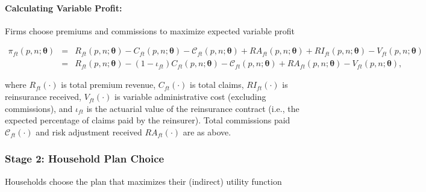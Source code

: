 \documentclass[12pt]{article}
\begin{document}
\paragraph{Calculating Variable Profit:} 
Firms choose premiums and commissions to maximize expected variable profit

\vspace{-0.4in}		
\begin{footnotesize}
\begin{eqnarray}
\label{eqn:profit}
	\pi_{ft}(\textit{p},\textit{n};\boldsymbol{\theta}) &=&  R_{ft}(\textit{p},\textit{n};\boldsymbol{\theta}) -  C_{ft}(\textit{p},\textit{n};\boldsymbol{\theta}) - \mathcal{C}_{ft}(\textit{p},\textit{n};\boldsymbol{\theta}) + RA_{ft}(\textit{p},\textit{n};\boldsymbol{\theta}) +  RI_{ft}(\textit{p},\textit{n};\boldsymbol{\theta})  - V_{ft}(\textit{p},\textit{n};\boldsymbol{\theta})  \nonumber \\
	&=& R_{ft}(\textit{p},\textit{n};\boldsymbol{\theta}) - (1 - \iota_{ft}) C_{ft}(\textit{p},\textit{n};\boldsymbol{\theta}) - \mathcal{C}_{ft}(\textit{p},\textit{n};\boldsymbol{\theta}) + RA_{ft}(\textit{p},\textit{n};\boldsymbol{\theta})   - V_{ft}(\textit{p},\textit{n};\boldsymbol{\theta}),
\end{eqnarray}
\end{footnotesize}

\noindent where $R_{ft}(\cdot)$ is total premium revenue, $C_{ft}(\cdot)$ is total claims, $RI_{ft}(\cdot)$ is reinsurance received, $V_{ft}(\cdot)$  is variable administrative cost (excluding commissions), and $\iota_{ft}$ is the actuarial value of the reinsurance contract (i.e., the expected percentage of claims paid by the reinsurer).  Total commissions paid $\mathcal{C}_{ft}(\cdot)$ and risk adjustment received  $RA_{ft}(\cdot)$ are as above.


\subsubsection{Stage 2: Household Plan Choice}
Households choose the plan that maximizes their (indirect) utility function
\end{document}
